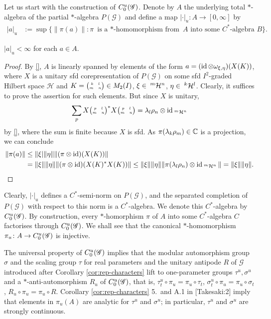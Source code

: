 Let us start with the construction of $\CuG$. Denote by $A$ the
underlying total $*$-algebra of the partial $*$-algebra
$P(\mathscr{G})$ and define a map $|\cdot |_{u} \colon A \to [0,\infty]$ by
\begin{align*}
  |a|_{u}&:= \sup \{ \|\pi(a)\| : \pi \text{ is a $*$-homomorphism
    from } A \text{ into some $C^{*}$-algebra } B\}.
\end{align*}
\begin{Lem}
  $|a|_{u}<\infty$ for each $a \in A$. 
\end{Lem}
\begin{proof}
  By \ref{}, $A$ is linearly spanned by elements of the form $a=(\id \otimes
  \omega_{\xi,\eta})(X(K))$, where $X$ is a unitary sfd
  corepresentation of $P(\mathscr{G})$ on some sfd $I^{2}$-graded
  Hilbert space $\mathcal{H}$ and $K=\pmat{k}{l}{m}{n}\in M_{2}(I)$,
  $\xi\in \Gru{\mathcal{H}}{m}{n}$, $\eta\in \Gru{\mathcal{H}}{k}{l}$.
  Clearly, it suffices to prove the assertion for such elements. But
  since $X$ is unitary, 
  \begin{align*}
    \sum_{p}X\pmat{p}{l}{m}{n}^{*} X\pmat{p}{l}{m}{n}  = \lambda_{l}\rho_{n}
    \otimes \id_{\Gru{\mathcal{H}}{m}{n}}
  \end{align*}
  by \ref{}, where the sum is finite because $X$ is sfd. As
  $\pi(\lambda_{k}\rho_{m})\in \C$ is a projection, we can conclude
  \begin{align*}
    \|\pi(a)\| &\leq \| \xi| \|\eta\| \|(\pi \otimes \id)(X(K))\| \\
    &=\|\xi\|\|\eta\| \|(\pi \otimes \id)(X(K)^{*}X(K))\| \leq
    \|\xi\|\|\eta\| \|\pi(\lambda_{l}\rho_{n}) \otimes
    \id_{\Gru{\mathcal{H}}{m} {n}}\| = \|\xi\|\|\eta\|.  
  \end{align*}
\end{proof}
Clearly, $|\cdot|_{u}$ defines a $C^{*}$-semi-norm on
$P(\mathscr{G})$, and the separated completion of $P(\mathscr{G})$
with respect to this norm is a $C^{*}$-algebra. We denote this
$C^{*}$-algebra by $\CuG$. By construction, every $*$-homorphism $\pi$
of $A$ into some $C^{*}$-algebra $C$ factorises through $\CuG$. 
We shall see that the canonical $*$-homomorphism $\pi_{u} \colon A \to
\CuG$ is injective.
\begin{Rem}
  The universal property of $\CuG$ implies that the modular
  automorphism group $\sigma$ and the scaling group $\tau$ for real
  parameters and the unitary antipode $R$ of $\mathscr{G}$ introduced
  after Corollary \ref{cor:rep-characters} lift to one-parameter
  groups $\tau^{u},\sigma^{u}$ and a $*$-anti-automorphism $R_{u}$ of
  $\CuG$, that is, $\tau^{u}_{t} \circ \pi_{u}= \pi_{u} \circ \tau_{t}$,
  $\sigma^{u}_{t} \circ \pi_{u} = \pi_{u} \circ \sigma_{t}$, $R_{u}
  \circ \pi_{u} = \pi_{u} \circ R$. Corollary \ref{cor:rep-characters}
  5.\ and A.1 in \cite{} [Takesaki:2]  imply that elements in
  $\pi_{u}(A)$ are analytic for $\tau^{u}$ and $\sigma^{u}$; in
  particular, $\tau^{u}$ and $\sigma^{u}$ are strongly continuous.  
\end{Rem}


